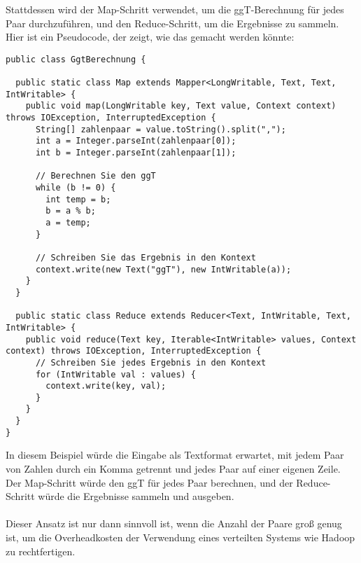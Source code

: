 Stattdessen wird der Map-Schritt verwendet, um die ggT-Berechnung für jedes Paar durchzuführen, und den Reduce-Schritt, um die Ergebnisse zu sammeln. Hier ist ein Pseudocode, der zeigt, wie das gemacht werden könnte:
\begin{lstlisting}[caption={Map- und Reduce},captionpos=b,label={lst:map_e}]
public class GgtBerechnung {

  public static class Map extends Mapper<LongWritable, Text, Text, IntWritable> {
    public void map(LongWritable key, Text value, Context context) throws IOException, InterruptedException {
      String[] zahlenpaar = value.toString().split(",");
      int a = Integer.parseInt(zahlenpaar[0]);
      int b = Integer.parseInt(zahlenpaar[1]);
      
      // Berechnen Sie den ggT
      while (b != 0) {
        int temp = b;
        b = a % b;
        a = temp;
      }
      
      // Schreiben Sie das Ergebnis in den Kontext
      context.write(new Text("ggT"), new IntWritable(a));
    }
  }

  public static class Reduce extends Reducer<Text, IntWritable, Text, IntWritable> {
    public void reduce(Text key, Iterable<IntWritable> values, Context context) throws IOException, InterruptedException {
      // Schreiben Sie jedes Ergebnis in den Kontext
      for (IntWritable val : values) {
        context.write(key, val);
      }
    }
  }
}
\end{lstlisting}
In diesem Beispiel würde die Eingabe als Textformat erwartet, mit jedem Paar von Zahlen durch ein Komma getrennt und jedes Paar auf einer eigenen Zeile. Der Map-Schritt würde den ggT für jedes Paar berechnen, und der Reduce-Schritt würde die Ergebnisse sammeln und ausgeben. 
\\\\
Dieser Ansatz ist nur dann sinnvoll ist, wenn die Anzahl der Paare groß genug ist, um die Overheadkosten der Verwendung eines verteilten Systems wie Hadoop zu rechtfertigen.

